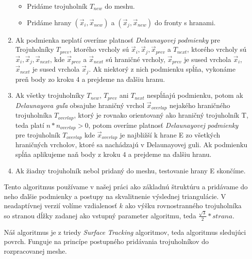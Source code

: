 \begin{enumerate}
{\begin{itemize}
        \item{Pridáme trojuholník $T_{new}$ do meshu.}
        \item{Pridáme hrany $(\overrightarrow{x}_i, \overrightarrow{x}_{new})$ a 
        $(\overrightarrow{x}_j, \overrightarrow{x}_{new})$ do fronty s hranami.}
    \end{itemize}
    }
    \item{
        Ak podmienka neplatí overíme platnosť \textit{Delaunayovej podmienky} pre Trojuholníky 
        $T_{prev}$, ktorého vrcholy sú $\overrightarrow{x}_i, \overrightarrow{x}_j, 
        \overrightarrow{x}_{prev}$ a $T_{next}$, ktorého vrcholy sú 
        $\overrightarrow{x}_i, \overrightarrow{x}_j, \overrightarrow{x}_{next}$, kde 
        $\overrightarrow{x}_{prev}$ a $\overrightarrow{x}_{next}$ sú hraničné vrcholy, 
        $\overrightarrow{x}_{prev}$ 
        je sused vrchola $\overrightarrow{x}_i$, $\overrightarrow{x}_{next}$ je sused vrchola 
        $\overrightarrow{x}_j$. Ak niektorý z nich podmienku
        spĺňa, vykonáme preň body zo kroku 4 a prejdeme na ďalšiu hranu.
    }
    \item{
        Ak všetky trojuholníky $T_{new}$, $T_{prev}$ ani $T_{next}$ nespĺňajú podmienku, potom 
        ak \textit{Delaunayova guľa} obsajuhe hraničný vrchol $\overrightarrow{x}_{overlap}$ nejakého hraničného 
        trojuholníka $T_{overlap}$, ktorý je rovnako orientovaný ako hraničný trojuholník T, teda
        platí $n*n_{overlap} > 0$, potom overíme platnosť \textit{Delaunayovej podmienky} pre 
        trojuholník $T_{overlap}$ kde $\overrightarrow{x}_{overlap}$ je najbližší k hrane E zo všetkých hraničných
        vrcholov, ktoré sa nachádzajú v Delaunayovej guli. Ak podmienku spĺňa aplikujeme naň body z 
        kroku 4 a prejdeme na ďalšiu hranu.
    }
    \item{
        Ak žiadny trojuholník nebol pridaný do meshu, testovanie hrany E skončíme.
    }
\end{enumerate}

Tento algoritmus používame v našej práci ako základnú štruktúru a pridávame do neho ďalšie podmienky 
a postupy na skvalitnenie výslednej triangulácie. V neadaptívnej verzií volíme vzdialenosť $k$ ako 
výšku rovnostranného trojuholníka so stranou dĺžky zadanej ako vstupný parameter algoritmu, teda 
$\frac{\sqrt{3}}{2}*strana$.

Náš algoritmus je z triedy \textit{Surface Tracking} algoritmov, teda algoritmus sledujúci povrch.
Funguje na princípe postupného pridávania trojuholníkov do rozpracovanej meshe.


